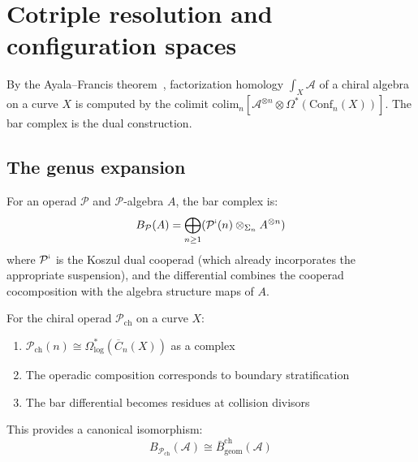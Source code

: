 \section{Cotriple resolution and configuration spaces}

\begin{remark}
By the Ayala--Francis theorem~\cite{AF15}, factorization homology $\int_X \mathcal{A}$ of a chiral algebra on a curve $X$ is computed by the colimit $\mathrm{colim}_{n} [ \mathcal{A}^{\otimes n} \otimes \Omega^*(\mathrm{Conf}_n(X)) ]$. The bar complex is the dual construction.
\end{remark}

\subsection{The genus expansion}
\label{sec:genus_expansion_panorama}

\begin{theorem}\label{thm:operadic-bar}
For an operad $\mathcal{P}$ and $\mathcal{P}$-algebra $A$, the bar complex is:
\[B_{\mathcal{P}}(A) = \bigoplus_{n \geq 1} (\mathcal{P}^{\text{\raisebox{0.5ex}{\tiny !`}}}(n) \otimes_{\Sigma_n} A^{\otimes n})\]
where $\mathcal{P}^{\text{\raisebox{0.5ex}{\tiny !`}}}$ is the Koszul dual cooperad (which already incorporates the appropriate suspension), and the differential combines the cooperad cocomposition with the algebra structure maps of $A$.
\end{theorem}

\begin{theorem}\label{thm:geometric-bridge}
For the chiral operad $\mathcal{P}_{\text{ch}}$ on a curve $X$:
\begin{enumerate}
\item $\mathcal{P}_{\text{ch}}(n) \cong \Omega^*_{\log}(\overline{C}_n(X))$ as a complex~\cite{KontsevichSoibelman}
\item The operadic composition corresponds to boundary stratification
\item The bar differential becomes residues at collision divisors
\end{enumerate}

This provides a canonical isomorphism:
\[B_{\mathcal{P}_{\text{ch}}}(\mathcal{A}) \cong \bar{B}^{\text{ch}}_{\text{geom}}(\mathcal{A})\]
\end{theorem}

